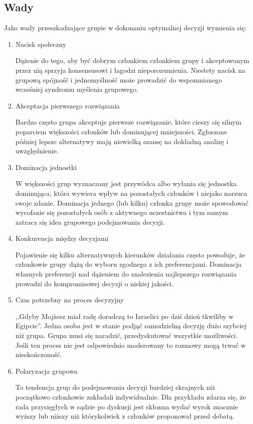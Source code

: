 \subsection{Wady}
Jako wady przeszkadzające grupie w dokonaniu optymalnej decyzji wymienia się:
\begin{enumerate}
  \item Nacisk społeczny
  
  Dążenie do tego, aby być dobrym członkiem członkiem grupy i akceptowanym przez
  nią sprzyja konsensusowi i łagodzi nieporozumienia. Niestety nacisk na grupową
  spójność i jednomyślność może prowadzić do wspomnianego wcześniej syndromu
  myślenia grupowego.
  
  \item Akceptacja pierwszego rozwiązania
  
  Bardzo często grupa akceptuje pierwsze rozwiązanie, które cieszy się silnym
  poparciem większości członków lub dominującej mniejszości. Zgłoszone później
  lepsze alternatywy mają niewielką szansę na dokładną analizę i uwzględnienie.
  
  \item Dominacja jednostki
  
  W większości grup wyznaczany jest przywódca albo wyłania się jednostka
  dominująca, która wywiera wpływ na pozostałych członków i niejako narzuca
  swoje zdanie. Dominacja jednego (lub kilku) członka grupy może spowodować
  wycofanie się pozostałych osób z aktywnego uczestnictwa i tym samym zatraca
  się idea grupowego podejmowania decyzji.
  
  \item Konkurencja między decyzjami
  
  Pojawienie się kilku alternatywnych kierunków działania często powoduje, że
  członkowie grupy dążą do wyboru zgodnego z ich preferencjami. Dominacja
  własnych preferencji nad dążeniem do znalezienia najlepszego rozwiązania
  prowadzi do kompromisowej decyzji o niskiej jakości.
  
  \item Czas potrzebny na proces decyzyjny
  
  ,,Gdyby Mojżesz miał radę doradczą to Izraelici po dziś dzień tkwiliby w
  Egipcie''. Jedna osoba jest w stanie podjąć samodzielną decyzję dużo szybciej
  niż grupa. Grupa musi się naradzić, przedyskutować wszystkie możliwości. 
  Jeśli ten proces nie jest odpowiednio moderowany to rozmowy mogą trwać w
  nieskończoność.

  \item Polaryzacja grupowa
  
  To tendencja grup do podejmowania decyzji bardziej skrajnych niż początkowo
  członkowie zakładali indywidualnie. Dla przykładu zdarza się, że rada
  przysięgłych w sądzie po dyskusji jest skłonna wydać wyrok znacznie wyższy lub
  niższy niż którykolwiek z członków proponował przed debatą.

\end{enumerate}

